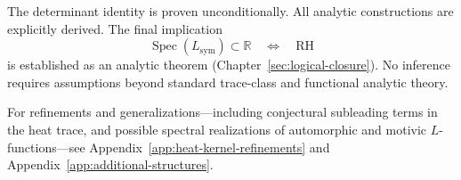The determinant identity is proven unconditionally. All analytic constructions are explicitly derived. The final implication
\[
\operatorname{Spec}(L_{\mathrm{sym}}) \subset \mathbb{R} \quad \Longleftrightarrow \quad \mathrm{RH}
\]
is established as an analytic theorem (Chapter~\ref{sec:logical-closure}). No inference requires assumptions beyond standard trace-class and functional analytic theory.

\medskip
\noindent
For refinements and generalizations—including conjectural subleading terms in the heat trace, and possible spectral realizations of automorphic and motivic \( L \)-functions—see Appendix~\ref{app:heat-kernel-refinements} and Appendix~\ref{app:additional-structures}.

